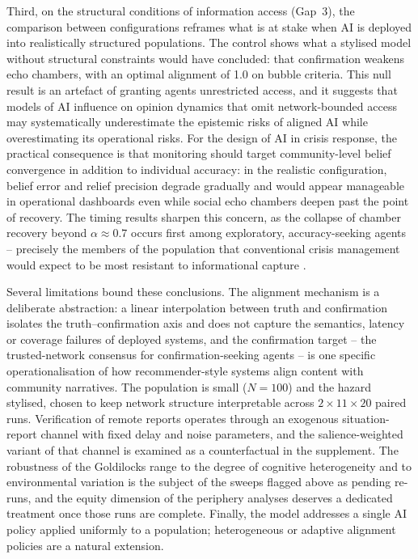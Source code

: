 \documentclass[sn-apacite]{sn-jnl}
\begin{document}
Third, on the structural conditions of information access (Gap~3), the comparison between configurations reframes what is at stake when AI is deployed into realistically structured populations. The control shows what a stylised model without structural constraints would have concluded: that confirmation weakens echo chambers, with an optimal alignment of 1.0 on bubble criteria. This null result is an artefact of granting agents unrestricted access, and it suggests that models of AI influence on opinion dynamics that omit network-bounded access may systematically underestimate the epistemic risks of aligned AI while overestimating its operational risks. For the design of AI in crisis response, the practical consequence is that monitoring should target community-level belief convergence in addition to individual accuracy: in the realistic configuration, belief error and relief precision degrade gradually and would appear manageable in operational dashboards even while social echo chambers deepen past the point of recovery. The timing results sharpen this concern, as the collapse of chamber recovery beyond $\alpha \approx 0.7$ occurs first among exploratory, accuracy-seeking agents -- precisely the members of the population that conventional crisis management would expect to be most resistant to informational capture \citep{comes2020coordination}.

Several limitations bound these conclusions. The alignment mechanism is a deliberate abstraction: a linear interpolation between truth and confirmation isolates the truth--confirmation axis and does not capture the semantics, latency or coverage failures of deployed systems, and the confirmation target -- the trusted-network consensus for confirmation-seeking agents -- is one specific operationalisation of how recommender-style systems align content with community narratives. The population is small ($N = 100$) and the hazard stylised, chosen to keep network structure interpretable across $2 \times 11 \times 20$ paired runs. Verification of remote reports operates through an exogenous situation-report channel with fixed delay and noise parameters, and the salience-weighted variant of that channel is examined as a counterfactual in the supplement. The robustness of the Goldilocks range to the degree of cognitive heterogeneity and to environmental variation is the subject of the sweeps flagged above as pending re-runs, and the equity dimension of the periphery analyses deserves a dedicated treatment once those runs are complete. Finally, the model addresses a single AI policy applied uniformly to a population; heterogeneous or adaptive alignment policies are a natural extension.
\end{document}

